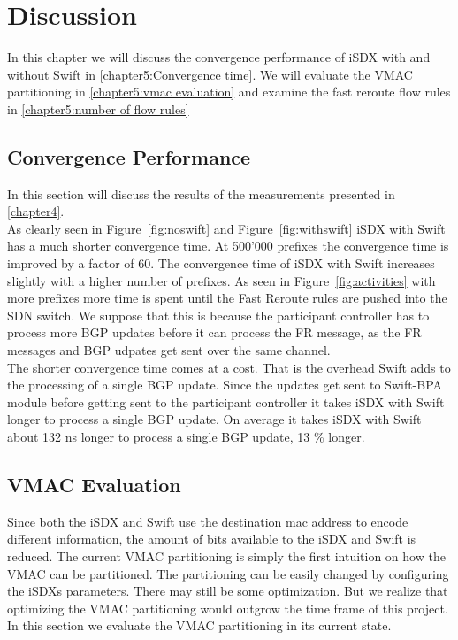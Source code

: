 \chapter{\label{chapter5}Discussion}

In this chapter we will discuss the convergence performance of iSDX with and without Swift in \ref{chapter5:Convergence time}. We will evaluate the VMAC partitioning in \ref{chapter5:vmac evaluation} and examine the fast reroute flow rules in \ref{chapter5:number of flow rules}

\section{\label{chapter5:Convergence time}Convergence Performance}

In this section will discuss the results of the measurements presented in \ref{chapter4}. \\
As clearly seen in Figure~\ref{fig:noswift} and Figure~\ref{fig:withswift} iSDX with Swift has a much shorter convergence time. At 500'000 prefixes the convergence time is improved by a factor of 60. The convergence time of iSDX with Swift increases slightly with a higher number of prefixes. As seen in Figure~\ref{fig:activities} with more prefixes more time is spent until the Fast Reroute rules are pushed into the SDN switch. We suppose that this is because the participant controller has to process more BGP updates before it can process the FR message, as the FR messages and BGP udpates get sent over the same channel. \\
The shorter convergence time comes at a cost. That is the overhead Swift adds to the processing of a single BGP update. Since the updates get sent to Swift-BPA module before getting sent to the participant controller it takes iSDX with Swift longer to process a single BGP update. On average it takes iSDX with Swift about 132 ns longer to process a single BGP update, 13 \% longer. 


\section{\label{chapter5:vmac evaluation}VMAC Evaluation}

Since both the iSDX and Swift use the destination mac address to encode different information, the amount of bits available to  the iSDX and Swift is reduced. The current VMAC partitioning is simply the first intuition on how the VMAC can be partitioned. The partitioning can be easily changed by configuring the iSDXs parameters. There may still be some optimization. But we realize that optimizing the VMAC partitioning would outgrow the time frame of this project. In this section we evaluate the VMAC partitioning in its current state.

